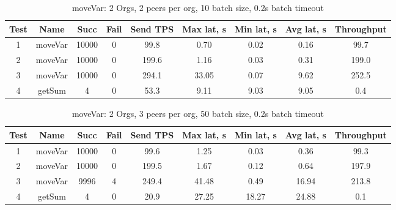 \begin{appendices}
\begin{table}[H]
\begin{center}
\begin{tabular}{ |c|c|c|c|c|c|c|c|c| }
 \hline
  Test & Name & Succ  & Fail & Send TPS & Max lat, s & Min lat, s & Avg lat, s & Throughput \\
 \hline
 \hline
 1    & moveVar & 10000 & 0    & 99.8  & 0.70      & 0.02      & 0.16      & 99.7 \\
 \hline
 2    & moveVar & 10000 & 0    & 199.6 & 1.16      & 0.03      & 0.31      & 199.0 \\
 \hline
 3    & moveVar & 10000 & 0    & 294.1 & 33.05     & 0.07      & 9.62      & 252.5 \\
 \hline
 4    & getSum  & 4     & 0    & 53.3  & 9.11      & 9.03      & 9.05      & 0.4 \\
 \hline
\end{tabular}
\end{center}
\caption{moveVar: 2 Orgs, 2 peers per org, 10 batch size, 0.2s batch timeout}
\end{table}

\begin{table}[H]
\begin{center}
\begin{tabular}{ |c|c|c|c|c|c|c|c|c| }
 \hline
  Test & Name & Succ  & Fail & Send TPS & Max lat, s & Min lat, s & Avg lat, s & Throughput \\
 \hline
 \hline
 1    & moveVar & 10000 & 0    & 99.6  & 1.25       & 0.03       & 0.36       & 99.3  \\
 \hline
 2    & moveVar & 10000 & 0    & 199.5 & 1.67       & 0.12       & 0.64       & 197.9 \\
 \hline
 3    & moveVar & 9996  & 4    & 249.4 & 41.48      & 0.49       & 16.94      & 213.8 \\
 \hline
 4    & getSum  & 4     & 0    & 20.9  & 27.25      & 18.27      & 24.88      & 0.1   \\
 \hline
\end{tabular}
\end{center}
\caption{moveVar: 2 Orgs, 3 peers per org, 50 batch size, 0.2s batch timeout}
\end{table}


\end{appendices}
